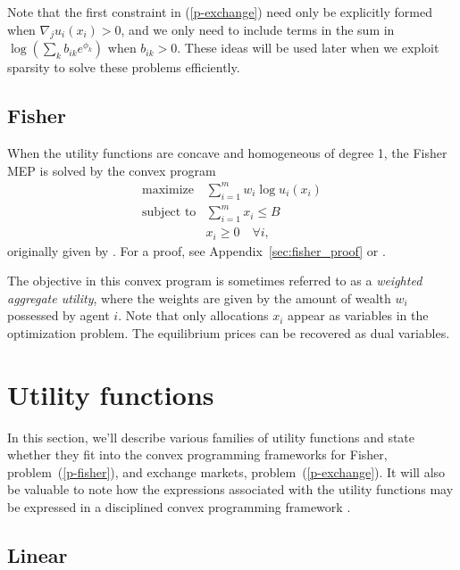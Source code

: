 \documentclass[12pt]{article}
\begin{document}
Note that the first constraint in (\ref{p-exchange}) need only be explicitly formed when
$\nabla_j u_i(x_i) > 0$, and we only need to include terms in the sum in
$\log(\sum_k b_{ik} e^{\phi_k})$ when $b_{ik} > 0$.
These ideas will be used later when we exploit sparsity to solve these
problems efficiently.

\subsection{Fisher}
\label{sec:convex_form_fisher}

When the utility functions are concave and homogeneous of degree 1,
the Fisher MEP is solved by the convex program
\begin{equation}
\label{p-fisher}
\begin{array}{ll}
\mbox{maximize} & \sum_{i=1}^m w_i \log u_i(x_i) \\
\mbox{subject to} & \sum_{i=1}^m x_i \leq B\\
& x_i \geq 0\quad \forall i,
\end{array}
\end{equation}
originally given by \cite{eisenberg1959consensus, gale1960theory, eisenberg1961aggregation}.
For a proof, see Appendix~\ref{sec:fisher_proof} or \cite[\S~6.2]{nisan2007algorithmic}.

The objective in this convex program is sometimes referred to as a \emph{weighted aggregate utility}, where the weights are given by the amount
of wealth $w_i$ possessed by agent $i$.
Note that only allocations $x_i$ appear as variables in the optimization
problem.
The equilibrium prices can be recovered as dual variables.

\section{Utility functions}
\label{sec:util_funcs}

In this section, we'll describe various families of utility functions
and state whether they fit into the convex programming frameworks
for Fisher, problem~(\ref{p-fisher}), and exchange markets, problem~(\ref{p-exchange}). 
It will also
be valuable to note how the expressions associated
with the utility functions may be expressed in a disciplined
convex programming framework \cite{GBY:06,Grant2004,cvx,cvxpy}.


\subsection{Linear}
\end{document}
